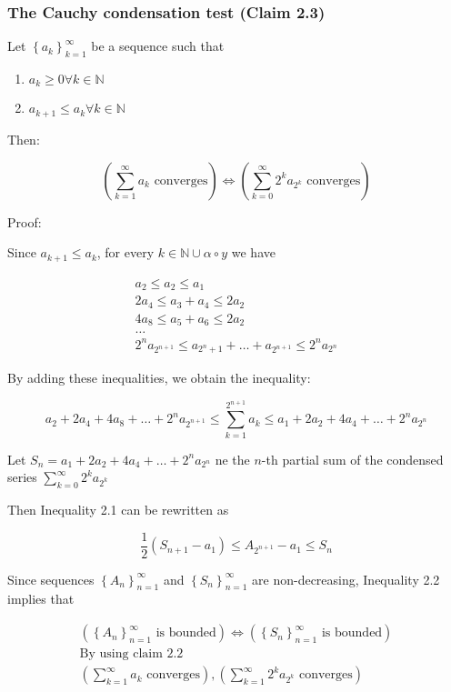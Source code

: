 \subsubsection{The Cauchy condensation test (Claim 2.3)}

Let \(\left\{ a_k \right\}_{k = 1}^{\infty}\) be a sequence such that
\begin{enumerate}
    \item \(a_k \geq 0 \forall k \in \mathbb{N} \)
    \item \(a_{k + 1} \leq a_k \forall k \in \mathbb{N} \)
\end{enumerate}

Then:

\[
    \left( \sum_{k = 1}^{\infty} a_k \text{ converges} \right) \Leftrightarrow \left( \sum_{k = 0}^{\infty}2^k a_{2^k} \text{ converges} \right)
\]

Proof:

Since \(a_{k + 1} \leq a_k\), for every \(k \in \mathbb{N} \cup \alpha \circ y\) we have

\begin{gather*}
    a_2 \leq a_2 \leq a_1 \\
    2a_4 \leq a_3 + a_4 \leq 2a_2 \\
    4a_8 \leq a_5 + a_6 \leq 2a_2 \\
    \dots \\
    2^n a_{2^{n+1}} \leq a_{2^n+1} + \dots + a_{2^{n + 1}} \leq 2^n a_{2^n}
\end{gather*}

By adding these inequalities, we obtain the inequality:

\[
    a_2 + 2a_4 + 4a_8 + \dots + 2^n a_{2^{n + 1}} \leq \sum_{k = 1}^{2^{n + 1}}a_k \leq a_1 + 2a_2 + 4a_4 + \dots + 2^n a_{2^n}
\]

Let \(S_n = a_1 + 2a_2 + 4a_4 + \dots + 2^n a_{2^n}\) ne the $n$-th partial sum of the condensed series \(\sum_{k = 0}^{\infty}2^k a_{2^k}\)

Then Inequality 2.1 can be rewritten as

\[
    \frac{1}{2} \left( S_{n + 1} - a_1 \right) \leq A_{2^{n + 1}} - a_1 \leq S_n
\]

Since sequences \(\left\{ A_n \right\}_{n = 1}^{\infty}\) and \(\left\{ S_n \right\}_{n = 1}^{\infty}\) are non-decreasing, Inequality 2.2 implies that

\begin{gather*}
    \left( \left\{ A_n \right\}_{n = 1}^{\infty} \text{ is bounded} \right) \Leftrightarrow \left( \left\{ S_n \right\}_{n = 1}^{\infty} \text{ is bounded} \right) \\
    \text{By using claim 2.2} \\
    \left( \sum_{k = 1}^{\infty} a_k \text{ converges} \right), \left( \sum_{k = 1}^{\infty} 2^k a_{2^k} \text{ converges} \right)
\end{gather*}

